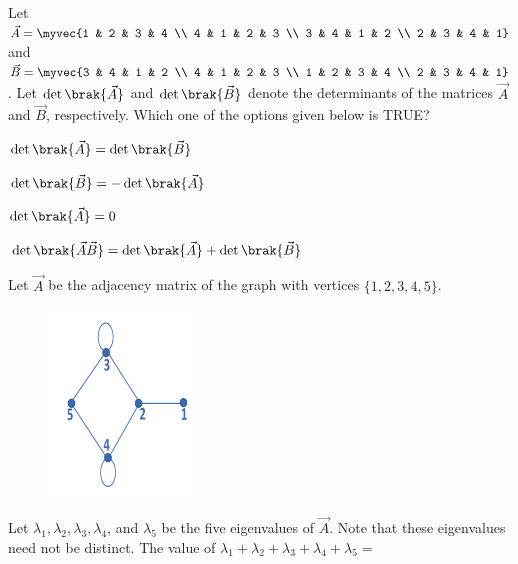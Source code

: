 		\item Let 
		$\vec{A} = \myvec{1 & 2 & 3 & 4 \\ 4 & 1 & 2 & 3 \\ 3 & 4 & 1 & 2 \\ 2 & 3 & 4 & 1}$
		and 
		$\vec{B} = \myvec{3 & 4 & 1 & 2 \\ 4 & 1 & 2 & 3 \\ 1 & 2 & 3 & 4 \\ 2 & 3 & 4 & 1}$.
		Let $\det\brak{\vec{A}}$ and $\det\brak{\vec{B}}$ denote the determinants of the matrices $\vec{A}$ and $\vec{B}$, respectively.
		Which one of the options given below is TRUE?
\hfill{}
		
		\begin{enumerate}
		\end{enumerate}
		\item Let $\vec{A}$ be the adjacency matrix of the graph with vertices $\{1, 2, 3, 4, 5\}$.
\begin{figure}[H]
	\centering
	\includegraphics[width=0.3\linewidth]{GATE/2023/CS/figs/screenshot009}
	\caption{}
	\label{fig:screenshot009}
\end{figure}
		Let $\lambda_1, \lambda_2, \lambda_3, \lambda_4$, and $\lambda_5$ be the five eigenvalues of $\vec{A}$. Note that these eigenvalues need not be distinct.
		The value of $\lambda_1 + \lambda_2 + \lambda_3 + \lambda_4 + \lambda_5 = $ \underline{\hspace{2cm}}
		\hfill{}
		
